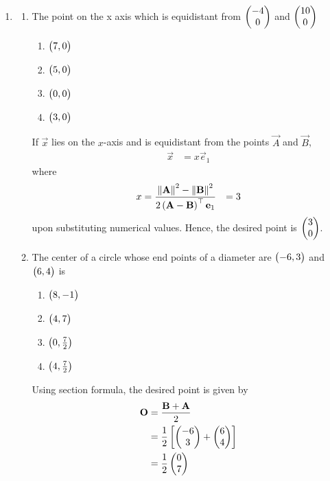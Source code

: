 \documentclass[journal,12pt,twocolumn]{IEEEtran}
\begin{document}
\begin{enumerate}[label=1.\arabic*]
\item \begin{enumerate}
\item The point on the x axis which is equidistant from $\begin{pmatrix}-4 \\ 0\end{pmatrix}$ and $\begin{pmatrix}10\\0\end{pmatrix}$\\
\begin{enumerate}
\item $\begin{pmatrix}7,0\end{pmatrix}$
\item $\begin{pmatrix}5,0\end{pmatrix}$
\item $\begin{pmatrix}0,0\end{pmatrix}$
\item $\begin{pmatrix}3,0\end{pmatrix}$
\end{enumerate}
\solution If $\vec{x}$ lies on the  $x$-axis and is  equidistant from the points $\vec{A}$ and $\vec{B}$, 
  \begin{align}
	  \vec{x} &=
	   x\vec{e}_1
  \end{align}
  where 
  \begin{align}
	  x &=\frac{\left\lVert\mathbf{A}\right\rVert^2 -\left\lVert\mathbf{B}\right\rVert^2 }{2\left(\mathbf{A}-\mathbf{B}\right)^{\top }\mathbf{e}_1
}
	  &= 3
	  \label{eq:cbse_10_x}
  \end{align}
upon   substituting numerical values. 
  Hence, the desired point is $\begin{pmatrix} 3 \\ 0\end{pmatrix}$.

\item The center of a circle whose end points of a diameter are $\begin{pmatrix}-6, 3\end{pmatrix}$ and $\begin{pmatrix}6,4\end{pmatrix}$ is
\begin{enumerate}
\item $\begin{pmatrix}8,-1\end{pmatrix}$
\item $\begin{pmatrix}4,7\end{pmatrix}$
\item $\begin{pmatrix}0,\frac{7}{2}\end{pmatrix}$
\item $\begin{pmatrix}4,\frac{7}{2}\end{pmatrix}$
\end{enumerate}
		\solution 
Using section formula, 
		the desired point is given by 
  \begin{align}
	  \mathbf{O}&= \frac{\mathbf{B}+ \mathbf{A}}{2}
	  \\
	  &= \frac{1}{2}{}\left[\begin{pmatrix} -6 \\ 3\end{pmatrix}+\begin{pmatrix}6 \\ 4\end{pmatrix}\right]
	  \\
	  &=\frac{1}{2}\begin{pmatrix}0 \\ 7\end{pmatrix}
  \end{align}
\end{enumerate}


\end{enumerate}
\end{document}
